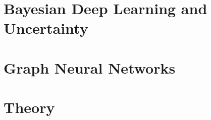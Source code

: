 \documentclass[11pt, oneside]{book}
\begin{document}
\chapter{Bayesian Deep Learning and Uncertainty}



\chapter{Graph Neural Networks}



\chapter{Theory}

\end{document}

